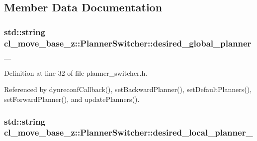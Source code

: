 \subsection{Member Data Documentation}
\subsubsection[{\texorpdfstring{desired\+\_\+global\+\_\+planner\+\_\+}{desired_global_planner_}}]{\setlength{\rightskip}{0pt plus 5cm}std\+::string cl\+\_\+move\+\_\+base\+\_\+z\+::\+Planner\+Switcher\+::desired\+\_\+global\+\_\+planner\+\_\+\hspace{0.3cm}{\ttfamily [private]}}\hypertarget{classcl__move__base__z_1_1PlannerSwitcher_aef047d3778b2993c1df146bbad43e03d}{}\label{classcl__move__base__z_1_1PlannerSwitcher_aef047d3778b2993c1df146bbad43e03d}


Definition at line 32 of file planner\+\_\+switcher.\+h.



Referenced by dynreconf\+Callback(), set\+Backward\+Planner(), set\+Default\+Planners(), set\+Forward\+Planner(), and update\+Planners().

\subsubsection[{\texorpdfstring{desired\+\_\+local\+\_\+planner\+\_\+}{desired_local_planner_}}]{\setlength{\rightskip}{0pt plus 5cm}std\+::string cl\+\_\+move\+\_\+base\+\_\+z\+::\+Planner\+Switcher\+::desired\+\_\+local\+\_\+planner\+\_\+\hspace{0.3cm}{\ttfamily [private]}}\hypertarget{classcl__move__base__z_1_1PlannerSwitcher_a6cbf65f11bb69125f913caaabdf7b4cf}{}\label{classcl__move__base__z_1_1PlannerSwitcher_a6cbf65f11bb69125f913caaabdf7b4cf}


